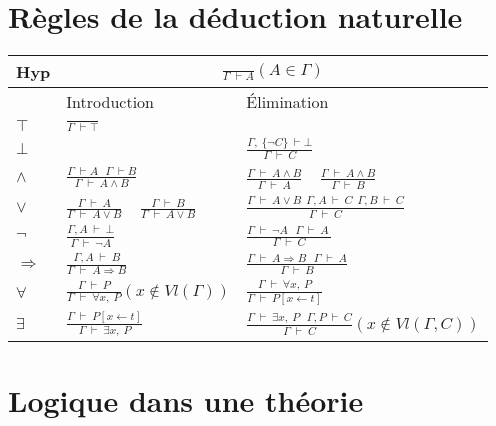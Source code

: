 \documentclass[11pt,a4paper]{article}
\begin{document}
\section{Règles de la déduction naturelle}

\begin{tabular}{|C{3cm}|C{6cm}|C{7cm}|}
  \hline
  Hyp &   \\
  \hline
  & Introduction & Élimination \\
  \hline
  $\top$ & {\Large $\frac{}{\Gamma \ \vdash \top }$} & \\
  \hline
  $\bot$ & & {\Large $\frac{\Gamma,\ \{\lnot C \} \ \vdash \bot}{\Gamma \ \vdash \ C}$} \\
  \hline
  $\land$ & {\Large $\frac{\Gamma \ \vdash A \ \ \ \Gamma \ \vdash B}{\Gamma \ \vdash \ A \land B}$} & {\Large $\frac{\Gamma \  \vdash \ A\land B }{\Gamma \  \vdash \ A }$} $ \ \ $ {\Large $\frac{\Gamma \  \vdash \ A\land B }{\Gamma \  \vdash \ B }$} \\
  \hline
  $\lor$ & {\Large $\frac{\Gamma \  \vdash \ A }{\Gamma \  \vdash \ A\lor B }$} $ \ \ $ {\Large $\frac{\Gamma \  \vdash \ B }{\Gamma \  \vdash \ A\lor B }$} & {\Large $\frac{\Gamma \  \vdash \ A \lor B \ \ \Gamma,A \ \vdash \ C \ \ \Gamma,B \ \vdash \ C}{\Gamma \  \vdash \ C  }$} \\
  \hline
  $\lnot$ & {\Large $\frac{\Gamma,A \  \vdash \ \bot  }{\Gamma \  \vdash \ \lnot A }$}  & {\Large $\frac{\Gamma \ \vdash \ \lnot A \ \ \ \Gamma \ \vdash \ A \  }{\Gamma \  \vdash \ C }$} \\
  \hline
  $\Rightarrow$ & {\Large $\frac{\Gamma,A \  \vdash \ B }{\Gamma \  \vdash \ A \Rightarrow B  }$} & {\Large $\frac{\Gamma \  \vdash \ A \Rightarrow B \ \ \ \Gamma \ \vdash \ A }{\Gamma \  \vdash \ B }$} \\
  \hline
  $\forall$ & {\Large $\frac{\Gamma \  \vdash \ P }{\Gamma \  \vdash \  \forall x, \ P}$}$(x \notin Vl(\Gamma))$ & {\Large $\frac{\Gamma \  \vdash \ \forall x, \ P }{\Gamma \  \vdash \ P[x \leftarrow t]  }$}\\
  \hline
  $\exists$ & {\Large $\frac{\Gamma \  \vdash \ P[x\leftarrow t] }{\Gamma \  \vdash \ \exists x, \ P }$} & {\Large $\frac{\Gamma \  \vdash \ \exists x, \ P \ \ \ \Gamma, P \ \vdash \ C  }{\Gamma \  \vdash \ C }$}$(x \notin Vl(\Gamma,C))$ \\
  \hline
\end{tabular}

\section{Logique dans une théorie}
\end{document}
